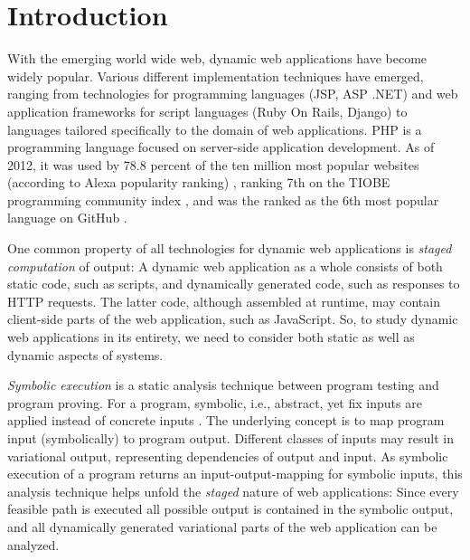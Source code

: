 \documentclass[preprint]{sig-alternate-05-2015}
\begin{document}



%
%
\printccsdesc



\section{Introduction}
With the emerging world wide web, dynamic web applications have become
widely popular. Various different implementation techniques have emerged,
ranging from technologies for programming languages (JSP, ASP .NET) and web
application frameworks for  script languages (Ruby On Rails, Django) to
languages tailored specifically to the domain of web applications. PHP \cite{phpNET} is
a programming language focused on server-side application development. As of 2012,
it was used by 78.8 percent of the ten million most popular websites (according
to Alexa popularity ranking) \cite{alexaPHP}, ranking 7th on the TIOBE
programming community index \cite{tiobePHP}, and was the ranked as the 6th most
popular language on GitHub \cite{githubPHP}.

One common property of all technologies for dynamic web applications is \emph{staged computation} of output: A dynamic web application as a whole consists of both static code, such as scripts, and dynamically generated code, such as responses to HTTP requests. The latter code, although assembled at runtime, may contain client-side parts of the web application, such as JavaScript. So, to study dynamic web applications in its entirety, we need to consider both static as well as dynamic aspects of systems.


\emph{Symbolic execution} is a static analysis technique between program testing
and program proving. For a program, symbolic, i.e., abstract, yet fix inputs are
applied instead of concrete inputs \cite{Darringer1978,King1976}. The underlying
concept is to map program input (symbolically) to program output. Different classes of inputs may
result in variational output, representing dependencies of output and input.
As symbolic execution of a program returns an input-output-mapping for symbolic inputs, this analysis technique helps unfold the \emph{staged} nature of web applications: Since every feasible path is executed all possible output is contained in the symbolic output, and all dynamically generated variational parts of the web application can be analyzed.
\end{document}
